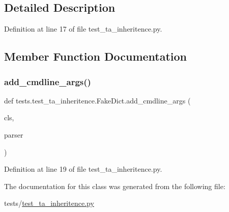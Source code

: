 \subsection{Detailed Description}


Definition at line 17 of file test\+\_\+ta\+\_\+inheritence.\+py.



\subsection{Member Function Documentation}
\mbox{\label{classtests_1_1test__ta__inheritence_1_1FakeDict_a75f0777e5a33a01975af1f8d40b79faa}} 
\subsubsection{\texorpdfstring{add\+\_\+cmdline\+\_\+args()}{add\_cmdline\_args()}}
{\footnotesize\ttfamily def tests.\+test\+\_\+ta\+\_\+inheritence.\+Fake\+Dict.\+add\+\_\+cmdline\+\_\+args (\begin{DoxyParamCaption}\item[{}]{cls,  }\item[{}]{parser }\end{DoxyParamCaption})}



Definition at line 19 of file test\+\_\+ta\+\_\+inheritence.\+py.



The documentation for this class was generated from the following file\+:\begin{DoxyCompactItemize}
\item 
tests/\hyperlink{test__ta__inheritence_8py}{test\+\_\+ta\+\_\+inheritence.\+py}\end{DoxyCompactItemize}

